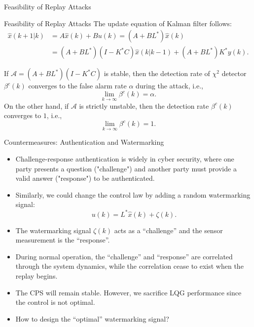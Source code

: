 \documentclass[10pt]{beamer}
\newcommand{\tikzdir}[1]{#1.tikz}
\newcommand{\inputtikz}[1]{}}
\begin{document}
  \begin{frame}{Feasibility of Replay Attacks}
    \begin{figure}[htpb]
      \begin{center}
	\inputtikz{replaydiagramthree}
      \end{center}
    \end{figure}
  \end{frame}

  \begin{frame}{Feasibility of Replay Attacks}
    The update equation of Kalman filter follows:
    \begin{align*}
      \hat{x}(k+1|k)&=A\hat{x}(k)+Bu(k)=\left(A+BL^*\right)\hat{x}(k)\\
      &=\left(A+BL^*\right)\left(I-K^*C\right)\hat{x}(k|k-1)+\left(A+BL^*\right)K^*y(k).
    \end{align*}

    \begin{theorem}
      If $\mathcal A = (A+BL^*)(I-K^*C)$ is stable, then the detection rate of $\chi^2$ detector $\beta^c(k)$ converges to the false alarm rate $\alpha$ during the attack, i.e.,
      \begin{displaymath}
	\lim_{k\rightarrow\infty}\beta^c(k) = \alpha.  
      \end{displaymath}
      On the other hand, if $\mathcal A$ is strictly unstable, then the detection rate $\beta^c(k)$ converges to $1$, i.e.,
      \begin{displaymath}
	\lim_{k\rightarrow\infty}\beta^c(k) = 1.  
      \end{displaymath}
    \end{theorem}
  \end{frame}

  \begin{frame}{Countermeasures: Authentication and Watermarking}
    \begin{itemize}
      \item Challenge-response authentication is widely in cyber security, where one party presents a question ("challenge") and another party must provide a valid answer ("response") to be authenticated.
      \item Similarly, we could change the control law by adding a random watermarking signal:
	\begin{displaymath}
	  u(k) = L^*\hat x(k) + \zeta(k).
	\end{displaymath}
      \item The watermarking signal $\zeta(k)$ acts as a ``challenge'' and the sensor measurement is the ``response''. 
      \item During normal operation, the ``challenge'' and ``response'' are correlated through the system dynamics, while the correlation cease to exist when the replay begins.
      \item The CPS will remain stable. However, we sacrifice LQG performance since the control is not optimal.
      \item How to design the ``optimal'' watermarking signal?
    \end{itemize}
  \end{frame}
\end{document}
